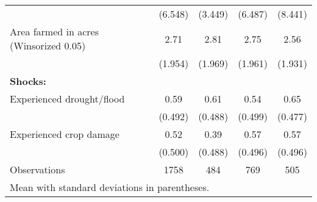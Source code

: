 {\begin{tabular}{l*{4}{c}}
                    &     (6.548)         &     (3.449)         &     (6.487)         &     (8.441)         \\
[1em]
Area farmed in acres (Winsorized 0.05)&        2.71         &        2.81         &        2.75         &        2.56         \\
                    &     (1.954)         &     (1.969)         &     (1.961)         &     (1.931)         \\
[1em]
\textbf{Shocks:}    &                     &                     &                     &                     \\
[1em]
Experienced drought/flood&        0.59         &        0.61         &        0.54         &        0.65         \\
                    &     (0.492)         &     (0.488)         &     (0.499)         &     (0.477)         \\
[1em]
Experienced crop damage&        0.52         &        0.39         &        0.57         &        0.57         \\
                    &     (0.500)         &     (0.488)         &     (0.496)         &     (0.496)         \\
\hline
Observations        &        1758         &         484         &         769         &         505         \\
\hline\hline
\multicolumn{5}{l}{\footnotesize Mean with standard deviations in parentheses.}\\
\end{tabular}
}
